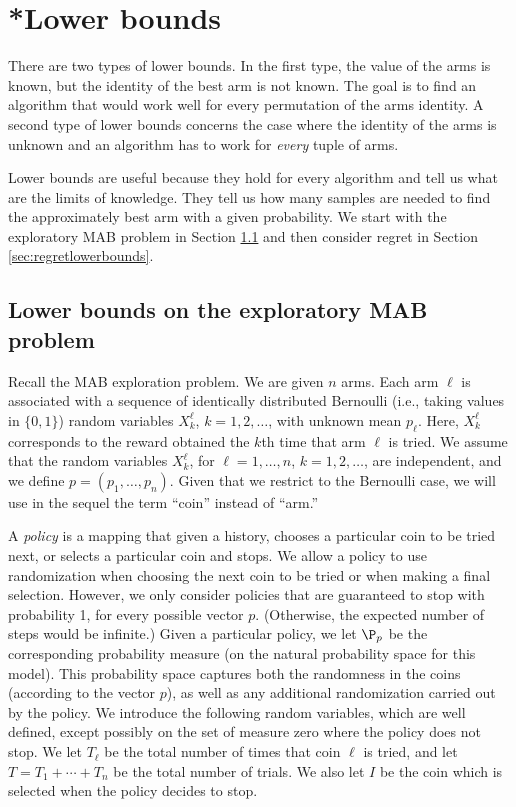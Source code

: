 \section{*Lower bounds}

There are two types of lower bounds. In the first type, the value of the arms is known, but the identity of the
best arm is not known. The goal is to find an algorithm that would work well for every permutation of the arms identity.
A second type of lower bounds concerns the case where the identity of the arms is unknown and an algorithm has to work for {\em every} tuple of arms.

Lower bounds are useful because they hold for every algorithm and tell us what are the limits of knowledge. They tell us how many samples are needed to find the approximately best arm with a given probability.
We start with the exploratory MAB problem in Section \ref{sec:explorelowerbounds}  and then consider regret in Section \ref{sec:regretlowerbounds}.

\subsection{Lower bounds on the exploratory MAB problem}

\label{sec:explorelowerbounds}

Recall the MAB exploration problem.
 We are given $n$ arms. Each arm $\ell$
is associated with a sequence of identically distributed Bernoulli
(i.e., taking values in $\{0,1\}$) random variables $X^\ell_k$,
$k=1,2,\ldots$, with unknown mean $p_\ell$. Here, $X^\ell_k$ corresponds to the
reward obtained the $k$th time that arm $\ell$ is tried. We assume
that the random variables $X^\ell_k$, for $\ell=1,\ldots, n$,
$k=1,2,\ldots$, are independent, and we define
$p=(p_1,\ldots,p_n)$. Given that we restrict to the Bernoulli
case, we will use in the sequel the term ``coin'' instead of
``arm.''

A {\it policy} is a mapping that given a history, chooses
a particular coin to be tried next, or selects a particular coin
and stops. We allow a policy to use randomization when choosing the
next
coin to be tried or when making a final selection. However, we only
consider policies that are guaranteed to stop with probability 1,
for every possible vector $p$. (Otherwise, the expected number of
steps would be infinite.) Given a particular policy, we let
$\P_{p}$ be the corresponding  probability measure (on the
natural probability space for this model). This probability space
captures both the randomness in the coins (according to the vector
$p$), as well as any additional randomization carried out by the
policy. We introduce the following random variables, which are
well defined, except possibly on the set of measure zero where the
policy does not stop. We let $T_\ell$ be the total number of times
that coin $\ell$ is tried, and let $T=T_1+\cdots+T_n$ be the total
number of trials. We also let $I$ be the coin which is selected
when the policy decides to stop.

